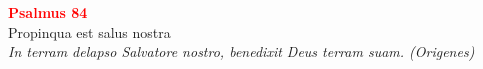 


\def\greinitialformat#1{%
{\fontsize{39}{39}\selectfont #1}%
}




\vspace{0.3cm}
\begin{center}
 \textcolor{red}{\large \bf Psalmus 84}\\
Propinqua est salus nostra\\
\textit{\small In terram delapso Salvatore nostro, benedixit Deus terram suam. (Origenes)}
\end{center}
